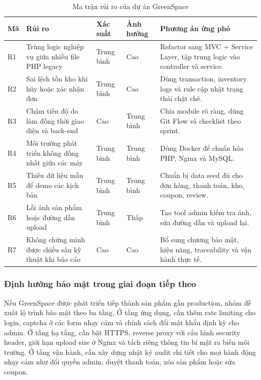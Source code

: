 \documentclass[11pt, a4paper]{article}
\begin{document}
\begin{table}[H]
    \centering
    \caption{Ma trận rủi ro của dự án GreenSpace}
    \label{tab:risk-matrix}
    \begin{tabularx}{\linewidth}{|>{\centering\arraybackslash}p{1cm}
                                  |>{\raggedright\arraybackslash}p{4.2cm}
                                  |>{\centering\arraybackslash}p{2.3cm}
                                  |>{\centering\arraybackslash}p{2.3cm}
                                  |Y|}
        \hline
        \textbf{Mã} & \textbf{Rủi ro} & \textbf{Xác suất} & \textbf{Ảnh hưởng} & \textbf{Phương án ứng phó} \\ \hline
        R1 & Trùng logic nghiệp vụ giữa nhiều file PHP legacy & Trung bình & Cao & Refactor sang MVC + Service Layer, tập trung logic vào controller và service. \\ \hline
        R2 & Sai lệch tồn kho khi hủy hoặc xác nhận đơn & Trung bình & Cao & Dùng transaction, inventory logs và rule cập nhật trạng thái chặt chẽ. \\ \hline
        R3 & Chậm tiến độ do làm đồng thời giao diện và back-end & Cao & Trung bình & Chia module rõ ràng, dùng Git Flow và checklist theo sprint. \\ \hline
        R4 & Môi trường phát triển không đồng nhất giữa các máy & Trung bình & Trung bình & Dùng Docker để chuẩn hóa PHP, Nginx và MySQL. \\ \hline
        R5 & Thiếu dữ liệu mẫu để demo các kịch bản & Trung bình & Trung bình & Chuẩn bị data seed đủ cho đơn hàng, thanh toán, kho, coupon, review. \\ \hline
        R6 & Lỗi ảnh sản phẩm hoặc đường dẫn upload & Trung bình & Thấp & Tạo tool admin kiểm tra ảnh, sửa đường dẫn và upload lại. \\ \hline
        R7 & Không chứng minh được chiều sâu kỹ thuật khi báo cáo & Cao & Cao & Bổ sung chương bảo mật, hiệu năng, traceability và vận hành thực tế. \\ \hline
    \end{tabularx}
\end{table}

\subsubsection{Định hướng bảo mật trong giai đoạn tiếp theo}

Nếu GreenSpace được phát triển tiếp thành sản phẩm gần production, nhóm đề xuất
lộ trình bảo mật theo ba tầng. Ở tầng ứng dụng, cần thêm rate limiting cho login,
captcha ở các form nhạy cảm và chính sách đổi mật khẩu định kỳ cho admin. Ở tầng
hạ tầng, cần bật HTTPS, reverse proxy với cấu hình security header, giới hạn upload
size ở Nginx và tách riêng thông tin bí mật ra biến môi trường. Ở tầng vận hành,
cần xây dựng nhật ký audit chi tiết cho mọi hành động nhạy cảm như đổi quyền admin,
duyệt thanh toán, xóa sản phẩm hoặc sửa coupon.
\end{document}
